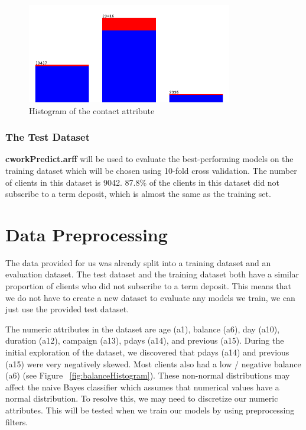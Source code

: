 \documentclass[a4paper,11pt]{article}
\begin{document}
\begin{figure}[H]
  \centering
  \includegraphics[width=0.8\textwidth]{pictures/contactHistogram.png}
  \caption{Histogram of the contact attribute}
  \label{fig:contactHistogram}
\end{figure}

\subsubsection{The Test Dataset}

\textbf{cworkPredict.arff} will be used to evaluate the best-performing models on the training dataset which will
be chosen using 10-fold cross validation. The number of clients in this dataset is 9042. 87.8\% of the clients
in this dataset did not subscribe to a term deposit, which is almost the same as the training set.

\section{Data Preprocessing}

The data provided for us was already split into a training dataset and an evaluation dataset. The test dataset
and the training dataset both have a similar proportion of clients who did not subscribe to a term deposit. This means
that we do not have to create a new dataset to evaluate any models we train, we can just use the provided test
dataset.

The numeric attributes in the dataset are age (a1), balance (a6), day (a10), duration (a12), campaign (a13), pdays (a14), 
and previous (a15). During the initial exploration of the dataset, we discovered that pdays (a14) and previous (a15) 
were very negatively skewed. Most clients also had a low / negative balance (a6) (see Figure ~\ref{fig:balanceHistogram}). 
These non-normal distributions may affect the naive Bayes classifier which assumes that numerical values have a normal 
distribution. To resolve this, we may need to discretize our numeric attributes. This will be tested when we train
our models by using preprocessing filters.
\end{document}
